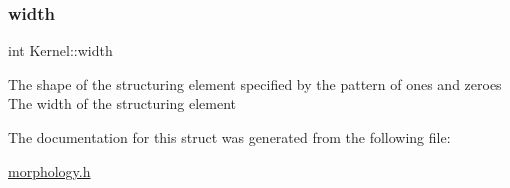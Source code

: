 \subsubsection{\texorpdfstring{width}{width}}
{\footnotesize\ttfamily int Kernel\+::width}

The shape of the structuring element specified by the pattern of ones and zeroes The width of the structuring element 

The documentation for this struct was generated from the following file\+:\begin{DoxyCompactItemize}
\item 
\hyperlink{morphology_8h}{morphology.\+h}\end{DoxyCompactItemize}
